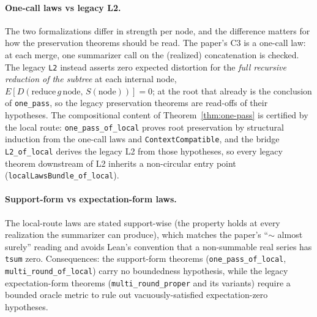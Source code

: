 \paragraph{One-call laws vs legacy L2.} The two formalizations differ in
strength per node, and the difference matters for how the preservation
theorems should be read. The paper's C3 is a one-call law: at each merge,
one summarizer call on the (realized) concatenation is checked. The legacy
\texttt{L2} instead asserts zero expected distortion for the \emph{full
recursive reduction of the subtree} at each internal node,
$E[D(\mathrm{reduce}\,g\,\mathrm{node},\,S(\mathrm{node}))]=0$; at the root
that already is the conclusion of \texttt{one\_pass}, so the legacy
preservation theorems are read-offs of their hypotheses. The compositional
content of Theorem~\ref{thm:one-pass} is certified by the local route:
\texttt{one\_pass\_of\_local} proves root preservation by structural
induction from the one-call laws and \texttt{ContextCompatible}, and the
bridge \texttt{L2\_of\_local} derives the legacy L2 from those hypotheses,
so every legacy theorem downstream of L2 inherits a non-circular entry
point (\texttt{localLawsBundle\_of\_local}).

\paragraph{Support-form vs expectation-form laws.} The local-route laws are
stated support-wise (the property holds at every realization the summarizer
can produce), which matches the paper's ``$\sim$ almost surely'' reading and
avoids Lean's convention that a non-summable real series has \texttt{tsum}
zero. Consequences: the support-form theorems
(\texttt{one\_pass\_of\_local}, \texttt{multi\_round\_of\_local}) carry no
boundedness hypothesis, while the legacy expectation-form theorems
(\texttt{multi\_round\_proper} and its variants) require a bounded oracle
metric to rule out vacuously-satisfied expectation-zero hypotheses.

